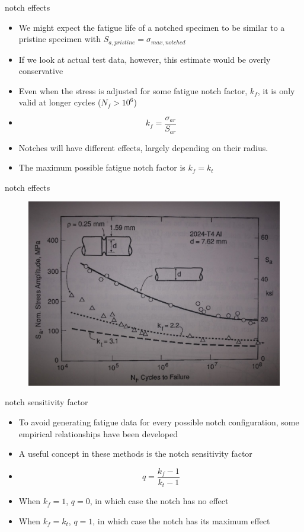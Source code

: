 \documentclass[10pt]{beamer}
\begin{document}
\begin{frame}{notch effects}
	\begin{itemize}[<+->]
		\item We might expect the fatigue life of a notched specimen to be similar to a pristine specimen with $S_{a,pristine} = \sigma_{max,notched}$
		\item If we look at actual test data, however, this estimate would be overly conservative
		\item Even when the stress is adjusted for some fatigue notch factor, $k_f$, it is only valid at longer cycles ($N_f > 10^6$)
		\item[] \begin{equation}
		k_f = \frac{\sigma_{ar}}{S_{ar}}
		\end{equation}
		\item Notches will have different effects, largely depending on their radius.
		\item The maximum possible fatigue notch factor is $k_f = k_t$
	\end{itemize}
\end{frame}

\begin{frame}{notch effects}
	\begin{figure}
	\centering
	\includegraphics[width=0.7\linewidth]{../Figures/notch_effect}
	\label{fig:notch_effect}
	\end{figure}
\end{frame}

\begin{frame}{notch sensitivity factor}
	\begin{itemize}[<+->]
		\item To avoid generating fatigue data for every possible notch configuration, some empirical relationships have been developed
		\item A useful concept in these methods is the notch sensitivity factor
		\item[] \begin{equation}
		q = \frac{k_f - 1}{k_t -1}
		\end{equation}
		\item When $k_f = 1$, $q=0$, in which case the notch has no effect
		\item When $k_f = k_t$, $q=1$, in which case the notch has its maximum effect
	\end{itemize}
\end{frame}
\end{document}
